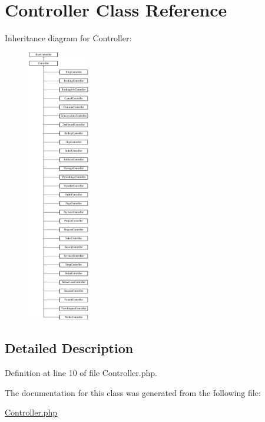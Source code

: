 \hypertarget{class_responsive_1_1_http_1_1_controllers_1_1_controller}{}\section{Controller Class Reference}
\label{class_responsive_1_1_http_1_1_controllers_1_1_controller}
Inheritance diagram for Controller\+:\begin{figure}[H]
\begin{center}
\leavevmode
\includegraphics[height=12.000000cm]{class_responsive_1_1_http_1_1_controllers_1_1_controller}
\end{center}
\end{figure}


\subsection{Detailed Description}


Definition at line 10 of file Controller.\+php.



The documentation for this class was generated from the following file\+:\begin{DoxyCompactItemize}
\item 
\mbox{\hyperlink{_controller_8php}{Controller.\+php}}\end{DoxyCompactItemize}
